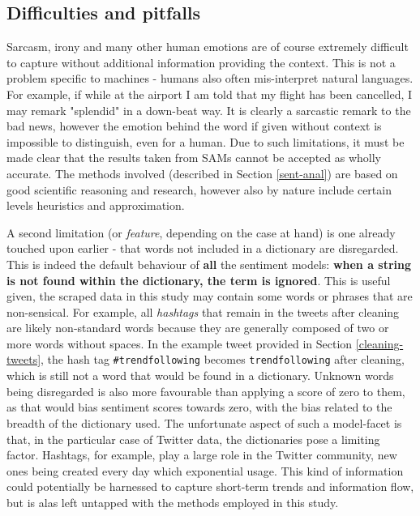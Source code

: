 \documentclass{article}
\begin{document}
\subsection{Difficulties and pitfalls \label{SA-limits}}
\label{sec-4-3}

Sarcasm, irony and many other human emotions are of course extremely difficult to capture without additional information providing the context. This is not a problem specific to machines - humans also often mis-interpret natural languages. For example, if while at the airport I am told that my flight has been cancelled, I may remark "splendid" in a down-beat way. It is clearly a sarcastic remark to the bad news, however the emotion behind the word if given without context is impossible to distinguish, even for a human. Due to such limitations, it must be made clear that the results taken from SAMs cannot be accepted as wholly accurate. The methods involved (described in Section \ref{sent-anal}) are based on good scientific reasoning and research, however also by nature include certain levels heuristics and approximation.

A second limitation (or \emph{feature}, depending on the case at hand) is one already touched upon earlier - that words not included in a dictionary are disregarded. This is indeed the default behaviour of \textbf{all} the sentiment models: \textbf{when a string is not found within the dictionary, the term is ignored}. This is useful given, the scraped data in this study may contain some words or phrases that are non-sensical. For example, all \emph{hashtags} that remain in the tweets after cleaning are likely non-standard words because they are generally composed of two or more words without spaces. In the example tweet provided in Section \ref{cleaning-tweets}, the hash tag \texttt{\#trendfollowing} becomes \texttt{trendfollowing} after cleaning, which is still not a word that would be found in a dictionary. Unknown words being disregarded is also more favourable than applying a score of zero to them, as that would bias sentiment scores towards zero, with the bias related to the breadth of the dictionary used.
The unfortunate aspect of such a model-facet is that, in the particular case of Twitter data, the dictionaries pose a limiting factor. Hashtags, for example, play a large role in the Twitter community, new ones being created every day which exponential usage. This kind of information could potentially be harnessed to capture short-term trends and information flow, but is alas left untapped with the methods employed in this study.
\end{document}
